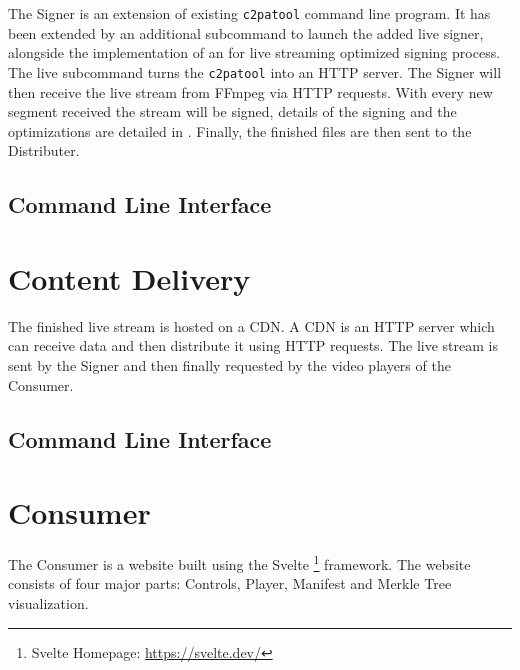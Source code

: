 The Signer is an extension of existing \texttt{c2patool} command line program. It has been extended by an additional subcommand to launch the added live signer, alongside the implementation of an for live streaming optimized signing process. The live subcommand turns the \texttt{c2patool} into an HTTP server. The Signer will then receive the live stream from FFmpeg via HTTP requests. With every new segment received the stream will be signed, details of the signing and the optimizations are detailed in . Finally, the finished files are then sent to the Distributer.


\subsection{Command Line Interface\label{sec:cli_signer}}


\section{Content Delivery\label{sec:cdn}}

The finished live stream is hosted on a CDN. A CDN is an HTTP server which can receive data and then distribute it using HTTP requests. The live stream is sent by the Signer and then finally requested by the video players of the Consumer.


\subsection{Command Line Interface\label{sec:cli_cdn}}


\section{Consumer\label{sec:consumer}}

The Consumer is a website built using the Svelte \footnote{Svelte Homepage: \url{https://svelte.dev/}} framework. The website consists of four major parts: Controls, Player, Manifest and Merkle Tree visualization.

